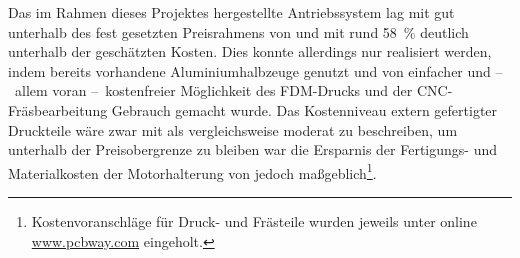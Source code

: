 		Das im Rahmen dieses Projektes hergestellte Antriebssystem lag mit  gut unterhalb des fest gesetzten Preisrahmens von  und mit rund \qty{58}{\percent} deutlich unterhalb der geschätzten Kosten.
		Dies konnte allerdings nur realisiert werden, indem bereits vorhandene Aluminiumhalbzeuge genutzt und von einfacher und --~allem voran --~kostenfreier Möglichkeit des FDM-Drucks und der CNC-Fräsbearbeitung Gebrauch gemacht wurde.
		Das Kostenniveau extern gefertigter Druckteile wäre zwar mit  als vergleichsweise moderat zu beschreiben, um unterhalb der Preisobergrenze zu bleiben war die Ersparnis der Fertigungs- und Materialkosten der Motorhalterung von  jedoch maßgeblich\footnote{\hspace{1mm}Kostenvoranschläge für Druck- und Frästeile wurden jeweils unter online \url{www.pcbway.com} eingeholt.}.